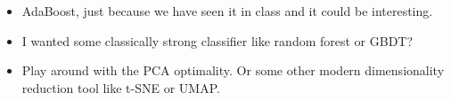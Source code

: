 \documentclass{article}
\begin{document}
\begin{itemize}
    \item AdaBoost, just because we have seen it in class and it could be interesting.
    \item I wanted some classically strong classifier like random forest or GBDT?
    \item Play around with the PCA optimality. Or some other modern dimensionality reduction tool like t-SNE or UMAP. 
\end{itemize}

\section{}
\end{document}

